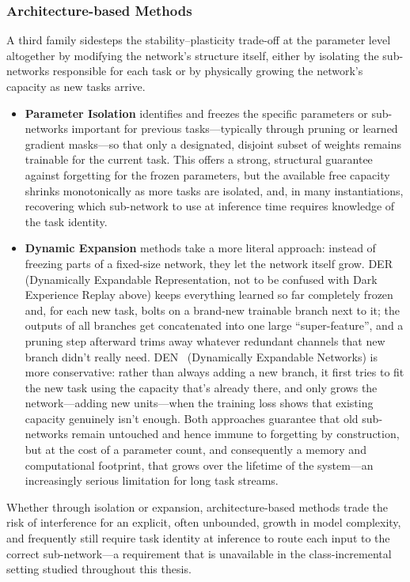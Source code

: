 \subsubsection{Architecture-based Methods}
A third family sidesteps the stability--plasticity trade-off at the parameter level altogether by modifying the network's structure itself, either by isolating the sub-networks responsible for each task or by physically growing the network's capacity as new tasks arrive.
\begin{itemize}
	\item \textbf{Parameter Isolation} \cite{10.5555/3454287.3455512} identifies and freezes the specific parameters or sub-networks important for previous tasks---typically through pruning or learned gradient masks---so that only a designated, disjoint subset of weights remains trainable for the current task. This offers a strong, structural guarantee against forgetting for the frozen parameters, but the available free capacity shrinks monotonically as more tasks are isolated, and, in many instantiations, recovering which sub-network to use at inference time requires knowledge of the task identity.
	
	\item \textbf{Dynamic Expansion} methods take a more literal approach: instead of freezing parts of a fixed-size network, they let the network itself grow. DER~\cite{Yan2021DERDE} (Dynamically Expandable Representation, not to be confused with Dark Experience Replay above) keeps everything learned so far completely frozen and, for each new task, bolts on a brand-new trainable branch next to it; the outputs of all branches get concatenated into one large ``super-feature'', and a pruning step afterward trims away whatever redundant channels that new branch didn't really need. DEN~\cite{Yoon2017LifelongLW} (Dynamically Expandable Networks) is more conservative: rather than always adding a new branch, it first tries to fit the new task using the capacity that's already there, and only grows the network—adding new units—when the training loss shows that existing capacity genuinely isn't enough. Both approaches guarantee that old sub-networks remain untouched and hence immune to forgetting by construction, but at the cost of a parameter count, and consequently a memory and computational footprint, that grows over the lifetime of the system---an increasingly serious limitation for long task streams.
\end{itemize}

Whether through isolation or expansion, architecture-based methods trade the risk of interference for an explicit, often unbounded, growth in model complexity, and frequently still require task identity at inference to route each input to the correct sub-network---a requirement that is unavailable in the class-incremental setting studied throughout this thesis.

